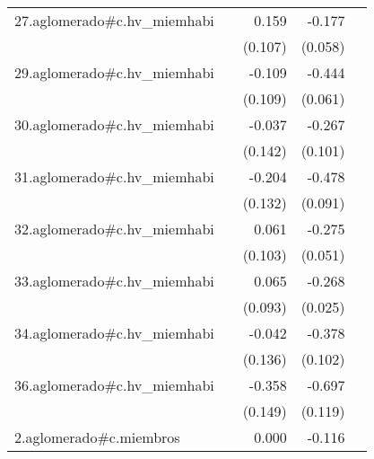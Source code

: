 {\begin{longtable}{l*{4}{D{.}{.}{-1}}}
\addlinespace
27.aglomerado#c.hv\_miemhabi&                     &       0.159         &      -0.177\sym{**} &                     \\
            &                     &     (0.107)         &     (0.058)         &                     \\
\addlinespace
29.aglomerado#c.hv\_miemhabi&                     &      -0.109         &      -0.444\sym{***}&                     \\
            &                     &     (0.109)         &     (0.061)         &                     \\
\addlinespace
30.aglomerado#c.hv\_miemhabi&                     &      -0.037         &      -0.267\sym{**} &                     \\
            &                     &     (0.142)         &     (0.101)         &                     \\
\addlinespace
31.aglomerado#c.hv\_miemhabi&                     &      -0.204         &      -0.478\sym{***}&                     \\
            &                     &     (0.132)         &     (0.091)         &                     \\
\addlinespace
32.aglomerado#c.hv\_miemhabi&                     &       0.061         &      -0.275\sym{***}&                     \\
            &                     &     (0.103)         &     (0.051)         &                     \\
\addlinespace
33.aglomerado#c.hv\_miemhabi&                     &       0.065         &      -0.268\sym{***}&                     \\
            &                     &     (0.093)         &     (0.025)         &                     \\
\addlinespace
34.aglomerado#c.hv\_miemhabi&                     &      -0.042         &      -0.378\sym{***}&                     \\
            &                     &     (0.136)         &     (0.102)         &                     \\
\addlinespace
36.aglomerado#c.hv\_miemhabi&                     &      -0.358\sym{*}  &      -0.697\sym{***}&                     \\
            &                     &     (0.149)         &     (0.119)         &                     \\
\addlinespace
2.aglomerado#c.miembros&                     &       0.000         &      -0.116\sym{***}&                     \\

\end{longtable}}
